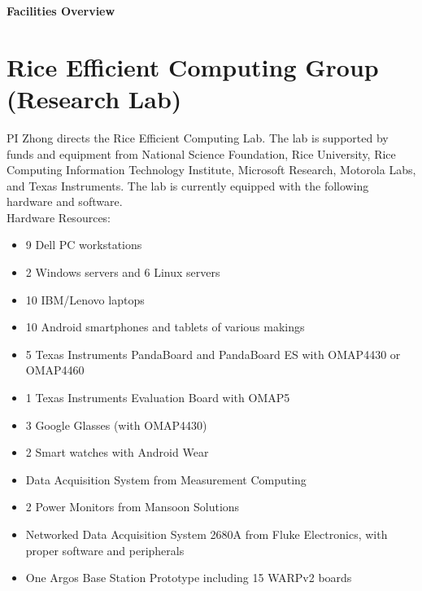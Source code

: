 %

\begin{center}
{\bf \large Facilities Overview}
\end{center}
\vspace{+2mm}


\section*{Rice Efficient Computing Group (Research Lab)}
PI Zhong directs the Rice Efficient Computing Lab. The lab is supported by funds and equipment from National Science Foundation, Rice University, Rice Computing Information Technology Institute, Microsoft Research, Motorola Labs, and Texas Instruments. The lab is currently equipped with the following hardware and software.\\

\noindent Hardware Resources:

\begin{itemize}
\vspace{-1.5mm}
\item  9 Dell PC workstations
\vspace{-1.5mm}
\item 2 Windows servers and 6 Linux servers
\vspace{-1.5mm}
\item 10 IBM/Lenovo laptops
\vspace{-1.5mm}
\item 10 Android smartphones and tablets of various makings

\vspace{-1.5mm}
\item 5 Texas Instruments PandaBoard and PandaBoard ES with OMAP4430 or OMAP4460

\vspace{-1.5mm}
\item 1 Texas Instruments Evaluation Board with OMAP5

\vspace{-1.5mm} 
\item 3 Google Glasses (with OMAP4430)
\vspace{-1.5mm} 
\item 2 Smart watches with Android Wear


\vspace{-1.5mm}
\item Data Acquisition System from Measurement Computing
\vspace{-1.5mm}
\item 2 Power Monitors from Mansoon Solutions
\vspace{-1.5mm}
\item Networked Data Acquisition System 2680A from Fluke Electronics, with proper software and peripherals
\vspace{-1.5mm}
\item One Argos Base Station Prototype including 15 WARPv2 boards
\end{itemize}

